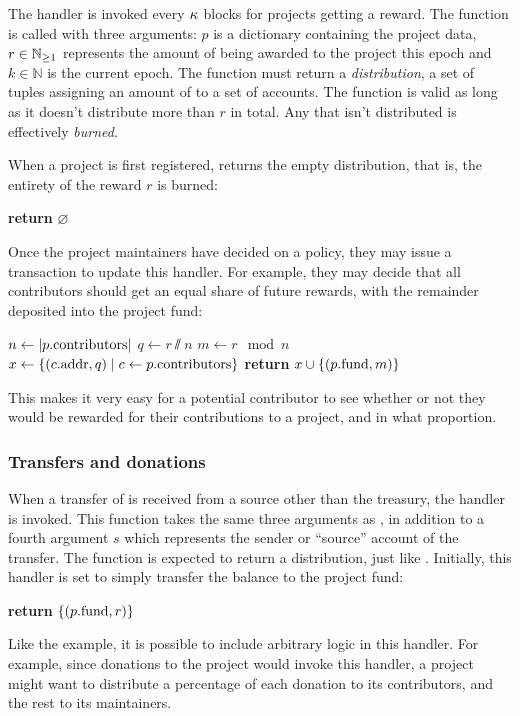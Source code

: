 The  handler is invoked every $\kappa$ blocks for
projects getting a reward. The function is called with three arguments: $p$ is
a dictionary containing the project data, $r \in \mathbb{N}_{\geq 1}$ represents the amount
of \oscoin{} being awarded to the project this epoch and $k \in \mathbb{N}$ is the
current epoch. The function must return a \emph{distribution}, a set of tuples
assigning an amount of \oscoin{} to a set of accounts. The function is valid
as long as it doesn't distribute more than $r$ \oscoin{} in total. Any \oscoin{}
that isn't distributed is effectively \emph{burned}.

When a project is first registered,  returns the empty
distribution, that is, the entirety of the reward $r$ is burned:
\begin{algorithmic}[0]
        \State \textbf{return} $\varnothing$
    \EndProcedure
\end{algorithmic}

\noindent Once the project maintainers have decided on a policy, they may issue a
transaction to update this handler. For example, they may decide that all
contributors should get an equal share of future rewards, with the remainder
deposited into the project fund:

\begin{algorithmic}[0]
        \State $n \gets |p.{\mathrm{contributors}}|$
        \State $q \gets r \sslash n$
        \State $m \gets r \mod n$
        \State $x \gets \{ (c.{\mathrm{addr}}, q) \mid c \gets p.{\mathrm{contributors}} \}$
        \State \textbf{return} $x \cup \{ (p.{\mathrm{fund}}, m) \}$
    \EndProcedure
\end{algorithmic}
This makes it very easy for a potential contributor to see whether or not they
would be rewarded for their contributions to a project, and in what proportion.

\subsubsection{Transfers and donations}

When a transfer of \oscoin{} is received from a source other than the treasury,
the  handler is invoked. This function takes the same
three arguments as , in addition to a fourth argument $s$ which
represents the sender or ``source'' account of the transfer. The function is
expected to return a distribution, just like . Initially,
this handler is set to simply transfer the balance to the project fund:
\medskip
\begin{algorithmic}[0]
        \State \textbf{return} $\{ (p.{\mathrm{fund}}, r) \}$
    \EndProcedure
\end{algorithmic}
Like the  example, it is possible to include
arbitrary logic in this handler. For example, since donations to the project
would invoke this handler, a project might want to distribute a percentage
of each donation to its contributors, and the rest to its maintainers.

